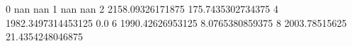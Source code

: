 0 nan nan
1 nan nan
2 2158.09326171875 175.7435302734375
4 1982.3497314453125 0.0
6 1990.42626953125 8.0765380859375
8 2003.78515625 21.4354248046875
